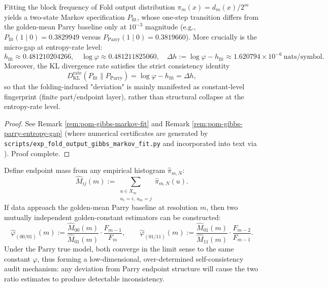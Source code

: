 \begin{conclusion}\label{con:xi-terminal-fold-output-gibbs-parry-microbit-gap}
Fitting the block frequency of Fold output distribution \(\pi_m(x)=d_m(x)/2^m\) yields a two-state Markov specification \(P_{\mathrm{fit}}\), whose one-step transition differs from the golden-mean Parry baseline only at \(10^{-3}\) magnitude (e.g., \(P_{\mathrm{fit}}(1\mid 0)=0.3829949\) versus \(P_{\mathrm{Parry}}(1\mid 0)=0.3819660\)).
More crucially is the micro-gap at entropy-rate level:
\[
h_{\mathrm{fit}}\approx 0.481210204266,\quad
\log\varphi\approx 0.481211825060,\quad
\Delta h:=\log\varphi-h_{\mathrm{fit}}\approx 1.620794\times 10^{-6}\ \text{nats/symbol}.
\]
Moreover, the KL divergence rate satisfies the strict consistency identity
\[
D_{\mathrm{KL}}^{\mathrm{rate}}(P_{\mathrm{fit}}\|P_{\mathrm{Parry}})=\log\varphi-h_{\mathrm{fit}}=\Delta h,
\]
so that the folding-induced "deviation" is mainly manifested as constant-level fingerprint (finite part/endpoint layer), rather than structural collapse at the entropy-rate level.
\end{conclusion}
\begin{proof}[Proof]
See Remark \ref{rem:pom-gibbs-markov-fit} and Remark \ref{rem:pom-gibbs-parry-entropy-gap} (where numerical certificates are generated by \texttt{scripts/exp\_fold\_output\_gibbs\_markov\_fit.py} and incorporated into text via \texttt{\string}). Proof complete.
\end{proof}
\begin{conclusion}\label{con:xi-terminal-parry-endpoint-mass-overdetermined-phi-audit}
Define endpoint mass from any empirical histogram \(\hat\pi_{m,N}\):
\[
\widehat M_{ij}(m):=\sum_{\substack{u\in X_m\\ u_1=i,\ u_m=j}}\hat\pi_{m,N}(u).
\]
If data approach the golden-mean Parry baseline at resolution \(m\), then two mutually independent golden-constant estimators can be constructed:
\[
\widehat\varphi_{(00/01)}(m):=\frac{\widehat M_{00}(m)}{\widehat M_{01}(m)}\cdot \frac{F_{m-1}}{F_m},
\qquad
\widehat\varphi_{(01/11)}(m):=\frac{\widehat M_{01}(m)}{\widehat M_{11}(m)}\cdot \frac{F_{m-2}}{F_{m-1}}.
\]
Under the Parry true model, both converge in the limit sense to the same constant \(\varphi\), thus forming a low-dimensional, over-determined self-consistency audit mechanism: any deviation from Parry endpoint structure will cause the two ratio estimates to produce detectable inconsistency.
\end{conclusion}
